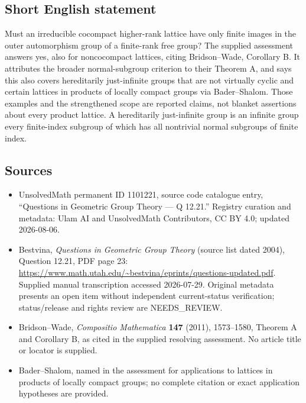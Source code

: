\documentclass[11pt]{article}
\begin{document}
\subsection{Short English statement}
Must an irreducible cocompact higher-rank lattice have only finite images in the outer automorphism group of a finite-rank free group? The supplied assessment answers yes, also for noncocompact lattices, citing Bridson--Wade, Corollary B. It attributes the broader normal-subgroup criterion to their Theorem A, and says this also covers hereditarily just-infinite groups that are not virtually cyclic and certain lattices in products of locally compact groups via Bader--Shalom. Those examples and the strengthened scope are reported claims, not blanket assertions about every product lattice. A hereditarily just-infinite group is an infinite group every finite-index subgroup of which has all nontrivial normal subgroups of finite index.
\subsection{Sources}
\begin{itemize}
\item UnsolvedMath permanent ID 1101221, source code catalogue entry, ``Questions in Geometric Group Theory --- Q 12.21.'' Registry curation and metadata: Ulam AI and UnsolvedMath Contributors, CC BY 4.0; updated 2026-08-06.
\item Bestvina, \emph{Questions in Geometric Group Theory} (source list dated 2004), Question 12.21, PDF page 23: \url{https://www.math.utah.edu/~bestvina/eprints/questions-updated.pdf}. Supplied manual transcription accessed 2026-07-29. Original metadata presents an open item without independent current-status verification; status/release and rights review are NEEDS\_REVIEW.
\item Bridson--Wade, \emph{Compositio Mathematica} \textbf{147} (2011), 1573--1580, Theorem A and Corollary B, as cited in the supplied resolving assessment. No article title or locator is supplied.
\item Bader--Shalom, named in the assessment for applications to lattices in products of locally compact groups; no complete citation or exact application hypotheses are provided.
\end{itemize}
\end{document}
